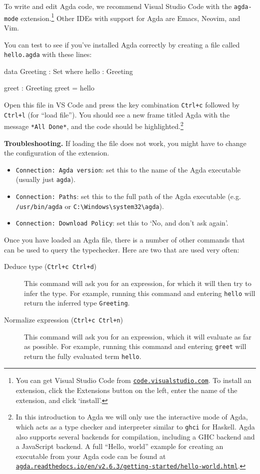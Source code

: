 \documentclass[a4paper,UKenglish]{tufte-handout}
\newcommand{\hrefu}[2]{\href{#1}{\nolinkurl{#2}}}
\theoremstyle{definition}
\begin{document}
To write and edit Agda code, we recommend Visual Studio Code with the
\texttt{agda-mode} extension.\footnote{You can get Visual Studio Code
from \hrefu{https://code.visualstudio.com/}{code.visualstudio.com}. To install an extension,
click the Extensions button on the left, enter the name of the
extension, and click `install'.}
Other IDEs with support for Agda are
Emacs, Neovim, and Vim.

You can test to see if you've installed Agda correctly by creating a file
called \texttt{hello.agda} with these lines:

\begin{code}[number]
data Greeting : Set where
  hello : Greeting

greet : Greeting
greet = hello
\end{code}
Open this file in VS Code and press the key combination
\texttt{Ctrl+c} followed by \texttt{Ctrl+l} (for ``load file''). You
should see a new frame titled Agda with the message \texttt{*All
Done*}, and the code should be highlighted.\footnote{In this
introduction to Agda we will only use the interactive mode of Agda,
which acts as a type checker and interpreter similar to \texttt{ghci}
for Haskell. Agda also supports several backends for compilation,
including a GHC backend and a JavaScript backend. A full ``Hello,
world'' example for creating an executable from your Agda code can be
found at
\hrefu{https://agda.readthedocs.io/en/v2.6.3/getting-started/hello-world.html}{agda.readthedocs.io/en/v2.6.3/getting-started/hello-world.html}.}

\textbf{Troubleshooting.}
If loading the file does not work, you might have to change the
configuration of the extension.
\begin{itemize}
\item \texttt{Connection: Agda version}: set this to the name of the Agda executable (usually just \texttt{agda}).
\item \texttt{Connection: Paths}: set this to the full path of the Agda executable (e.g. \texttt{/usr/bin/agda} or \texttt{C:\textbackslash{}Windows\textbackslash{}system32\textbackslash{}agda}).
\item \texttt{Connection: Download Policy}: set this to `No, and don't ask again'.
\end{itemize}

Once you have loaded an Agda file, there is a number of other commands that
can be used to query the typechecker. Here are two that are used very often:

\begin{description}
\item[Deduce type (\texttt{Ctrl+c Ctrl+d})] This command will ask you
  for an expression, for which it will then try to infer the type. For
  example, running this command and entering \texttt{hello} will
  return the inferred type \texttt{Greeting}.
\item[Normalize expression (\texttt{Ctrl+c Ctrl+n})] This command will ask you
  for an expression, which it will evaluate as far as possible. For
  example, running this command and entering \texttt{greet} will
  return the fully evaluated term \texttt{hello}.
\end{description}
\end{document}
